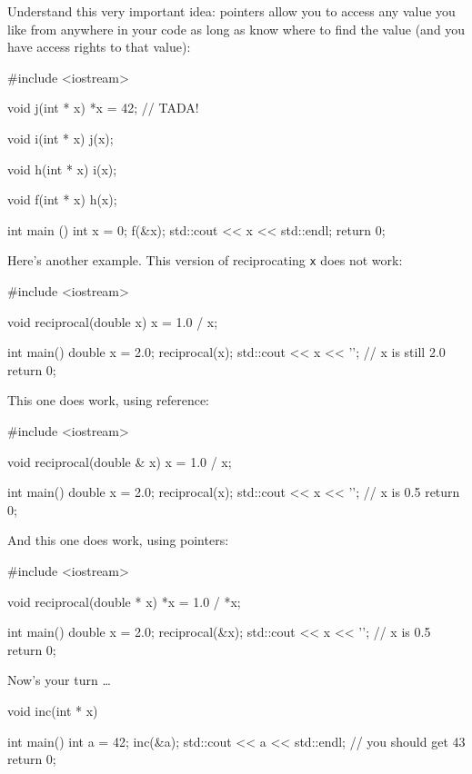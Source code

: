 Understand this very important idea: pointers allow you to access any value you like from anywhere in your code as long as know where to find the value (and you have access rights to that value):

\begin{consolethree}[escapeinside=||]

#include <iostream>

void j(int * x)
{    
     *x = 42; // TADA!
}

void i(int * x)
{
    j(x);
}

void h(int * x)
{
    i(x);
}

void f(int * x)
{
    h(x);
}

int main ()
{
    int x = 0;
    f(&x);
    std::cout << x << std::endl;
    return 0;
}
\end{consolethree}
Here's another example. This version of reciprocating \texttt{x} does not
work:

\begin{consolethree}[escapeinside=||]
#include <iostream>

void reciprocal(double x)
{
    x = 1.0 / x;
}

int main()
{
    double x = 2.0;
    reciprocal(x);
    std::cout << x << '\n';     // x is still 2.0
    return 0;
}
\end{consolethree}
This one does work, using reference:

\begin{consolethree}[escapeinside=||]
#include <iostream>

void reciprocal(double & x)
{
    x = 1.0 / x;
}

int main()
{
    double x = 2.0;
    reciprocal(x);
    std::cout << x << '\n';     // x is 0.5
    return 0;
}
\end{consolethree}
And this one does work, using pointers:

\begin{consolethree}[escapeinside=||]
#include <iostream>

void reciprocal(double * x)
{
    *x = 1.0 / *x;
}

int main()
{
    double x = 2.0;
    reciprocal(&x);
    std::cout << x << '\n';     // x is 0.5
    return 0;
}
\end{consolethree}
Now's your turn \ldots{}


\begin{consolethree}[escapeinside=||]
void inc(int * x)
{
}

int main()
{
    int a = 42;
    inc(&a);
    std::cout << a << std::endl;    // you should get 43
    return 0;
}
\end{consolethree}



